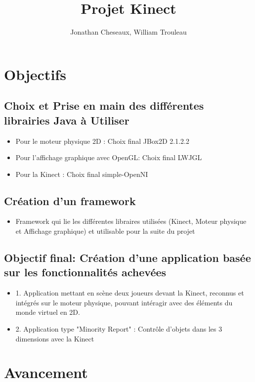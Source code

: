 \documentclass{article}
\title{Projet Kinect}
\author{Jonathan Cheseaux, William Trouleau}
\date{}
\begin{document}
\maketitle

\section{Objectifs}

	\subsection*{Choix et Prise en main des différentes librairies Java à Utiliser}
  		\begin{itemize}
  			\item Pour le moteur physique 2D : Choix final JBox2D 2.1.2.2 
  			\item Pour l'affichage graphique avec OpenGL: Choix final LWJGL
  			\item Pour la Kinect : Choix final simple-OpenNI
  		\end{itemize}

	\subsection*{Création d'un framework}
		\begin{itemize}
			\item Framework qui lie les différentes libraires utilisées (Kinect, Moteur physique et Affichage graphique) et utilisable pour la suite du projet
		\end{itemize}
	
  	
  	\subsection*{Objectif final: Création d'une application basée sur les fonctionnalités achevées}
		\begin{itemize}
			\item 1. Application mettant en sc\`ene deux joueurs devant la Kinect, reconnus et intégrés sur le moteur physique, pouvant intéragir avec des éléments du monde virtuel en 2D.
			\item 2. Application type "Minority Report" : Contrôle d'objets dans les 3 dimensions avec la Kinect
		\end{itemize}

  
\section{Avancement}
\end{document}
